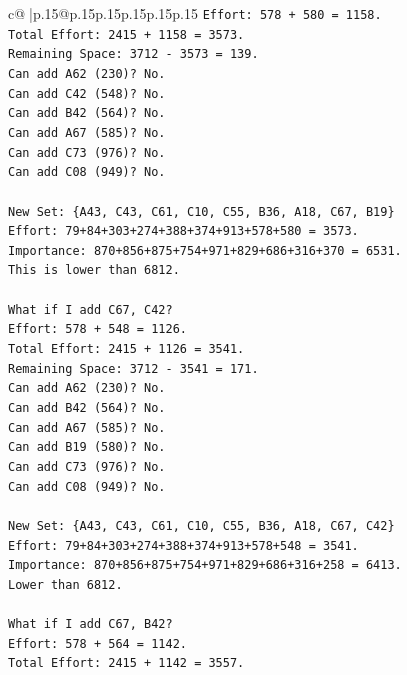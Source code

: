 \documentclass{article}
\begin{document}
{\begin{supertabular}{c@{$\;$}|p{.15\linewidth}@{}p{.15\linewidth}p{.15\linewidth}p{.15\linewidth}p{.15\linewidth}p{.15\linewidth}}
{{{\texttt{Effort: 578 + 580 = 1158.} \\
\texttt{Total Effort: 2415 + 1158 = 3573.} \\
\texttt{Remaining Space: 3712 {-} 3573 = 139.} \\
\texttt{Can add A62 (230)? No.} \\
\texttt{Can add C42 (548)? No.} \\
\texttt{Can add B42 (564)? No.} \\
\texttt{Can add A67 (585)? No.} \\
\texttt{Can add C73 (976)? No.} \\
\texttt{Can add C08 (949)? No.} \\
\\ 
\texttt{New Set: \{A43, C43, C61, C10, C55, B36, A18, C67, B19\}} \\
\texttt{Effort: 79+84+303+274+388+374+913+578+580 = 3573.} \\
\texttt{Importance: 870+856+875+754+971+829+686+316+370 = 6531.} \\
\texttt{This is lower than 6812.} \\
\\ 
\texttt{What if I add C67, C42?} \\
\texttt{Effort: 578 + 548 = 1126.} \\
\texttt{Total Effort: 2415 + 1126 = 3541.} \\
\texttt{Remaining Space: 3712 {-} 3541 = 171.} \\
\texttt{Can add A62 (230)? No.} \\
\texttt{Can add B42 (564)? No.} \\
\texttt{Can add A67 (585)? No.} \\
\texttt{Can add B19 (580)? No.} \\
\texttt{Can add C73 (976)? No.} \\
\texttt{Can add C08 (949)? No.} \\
\\ 
\texttt{New Set: \{A43, C43, C61, C10, C55, B36, A18, C67, C42\}} \\
\texttt{Effort: 79+84+303+274+388+374+913+578+548 = 3541.} \\
\texttt{Importance: 870+856+875+754+971+829+686+316+258 = 6413.} \\
\texttt{Lower than 6812.} \\
\\ 
\texttt{What if I add C67, B42?} \\
\texttt{Effort: 578 + 564 = 1142.} \\
\texttt{Total Effort: 2415 + 1142 = 3557.} \\
}}}
\end{supertabular}}
\end{document}
